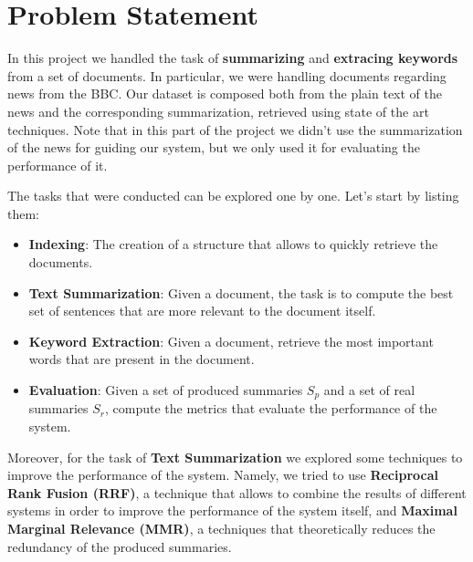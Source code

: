 \section{Problem Statement}
In this project we handled the task of \textbf{summarizing} and \textbf{extracing keywords} from a set of documents. In particular, 
we were handling documents regarding news from the BBC.
Our dataset is composed both from the plain text of the news and the corresponding summarization, retrieved using state of the art 
techniques. Note that in this part of the project we didn't use the summarization
of the news for guiding our system, but we only used 
it for evaluating the performance of it.

The tasks that were conducted can be explored one by one. Let's start by 
listing them:

\begin{itemize}
    \item \textbf{Indexing}: The creation of a structure 
    that allows to quickly retrieve the documents.
    \item \textbf{Text Summarization}: Given a document, the task is to 
    compute the best set of sentences that are more relevant to the document itself.
    \item \textbf{Keyword Extraction}: Given a document, retrieve the
    most important words that are present in the document.
    \item \textbf{Evaluation}: Given a set of produced summaries $S_p$ and a set of real summaries $S_r$,
    compute the metrics that evaluate the performance of the system.
\end{itemize}

Moreover, for the task of \textbf{Text Summarization} we explored 
some techniques to improve the performance of the system. Namely, 
we tried to use \textbf{Reciprocal Rank Fusion (RRF)}, a technique that
allows to combine the results of different systems in order to
improve the performance of the system itself, and \textbf{Maximal Marginal Relevance (MMR)}, a techniques that
theoretically reduces the redundancy of the produced summaries.